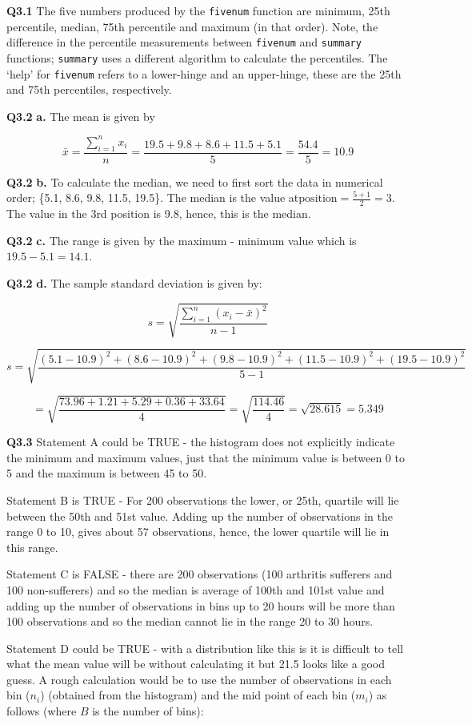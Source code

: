 \documentclass[
  oneside]{krantz}
\begin{document}
\textbf{Q3.1} The five numbers produced by the \texttt{fivenum} function are minimum, 25th percentile, median, 75th percentile and maximum (in that order). Note, the difference in the percentile measurements between \texttt{fivenum} and \texttt{summary} functions; \texttt{summary} uses a different algorithm to calculate the percentiles. The `help' for \texttt{fivenum} refers to a lower-hinge and an upper-hinge, these are the 25th and 75th percentiles, respectively.

\textbf{Q3.2} \textbf{a.} The mean is given by

\[ \bar x = \frac{\sum_{i=1}^{n} {x_i}}n=\frac{19.5 + 9.8 + 8.6 + 11.5 + 5.1}5 = \frac{54.4}5 = 10.9 \]

\textbf{Q3.2} \textbf{b.} To calculate the median, we need to first sort the data in numerical order; \{5.1, 8.6, 9.8, 11.5, 19.5\}. The median is the value at\(\textrm{position} =\frac{5+1}2 = 3\). The value in the 3rd position is 9.8, hence, this is the median.

\textbf{Q3.2} \textbf{c.} The range is given by the maximum - minimum value which is \(19.5 - 5.1 = 14.1\).

\textbf{Q3.2} \textbf{d.} The sample standard deviation is given by:

\[s = \sqrt{\frac{\sum_{i=1}^n{(x_i - \bar x)^2}}{n-1}} \]

\[s = \sqrt{\frac{(5.1-10.9)^2 + (8.6-10.9)^2 + (9.8-10.9)^2 + (11.5-10.9)^2 + (19.5-10.9)^2}{5-1}}\]

\[   = \sqrt{\frac{73.96 + 1.21 + 5.29 + 0.36 + 33.64}{4}} = \sqrt{\frac{114.46}4} = \sqrt{28.615} = 5.349 \]

\textbf{Q3.3} Statement A could be TRUE - the histogram does not explicitly indicate the minimum and maximum values, just that the minimum value is between 0 to 5 and the maximum is between 45 to 50.

Statement B is TRUE - For 200 observations the lower, or 25th, quartile will lie between the 50th and 51st value. Adding up the number of observations in the range 0 to 10, gives about 57 observations, hence, the lower quartile will lie in this range.

Statement C is FALSE - there are 200 observations (100 arthritis sufferers and 100 non-sufferers) and so the median is average of 100th and 101st value and adding up the number of observations in bins up to 20 hours will be more than 100 observations and so the median cannot lie in the range 20 to 30 hours.

Statement D could be TRUE - with a distribution like this is it is difficult to tell what the mean value will be without calculating it but 21.5 looks like a good guess. A rough calculation would be to use the number of observations in each bin (\(n_i\)) (obtained from the histogram) and the mid point of each bin (\(m_i\)) as follows (where \(B\) is the number of bins):
\end{document}
